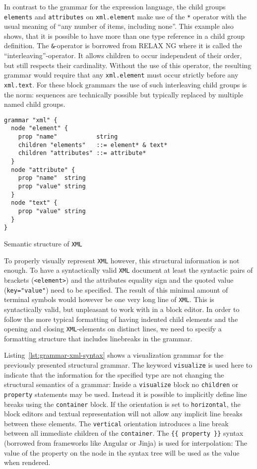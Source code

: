 \documentclass[sigconf,natbib=false,review=true,anonymous]{acmart}
\begin{document}
In contrast to the grammar for the expression language, the child groups \texttt{elements} and \texttt{attributes} on \texttt{xml.element} make use of the \texttt{*} operator with the usual meaning of \enquote{any number of items, including none}. This example also shows, that it is possible to have more than one type reference in a child group definition. The \texttt{\&}-operator is borrowed from RELAX NG where it is called the \enquote{interleaving}-operator. It allows children to occur independent of their order, but still respects their cardinality. Without the use of this operator, the resulting grammar would require that any \texttt{xml.element} must occur strictly before any \texttt{xml.text}. For these block grammars the use of such interleaving child groups is the norm: sequences are technically possible but typically replaced by multiple named child groups.

\begin{listing}[H]
\begin{verbatim}
grammar "xml" {
  node "element" {
    prop "name"           string
    children "elements"   ::= element* & text*
    children "attributes" ::= attribute*
  }
  node "attribute" {
    prop "name"  string
    prop "value" string
  }
  node "text" {
    prop "value" string
  }
}
\end{verbatim}
\caption{Semantic structure of \texttt{XML}}
\label{lst:grammar-xml-structure}
\end{listing}

To properly visually represent \texttt{XML} however, this structural information is not enough. To have a syntactically valid \texttt{XML} document at least the syntactic pairs of brackets (\texttt{<element>}) and the attributes equality sign and the quoted value (\texttt{key="value"}) need to be specified. The result of this minimal amount of terminal symbols would however be one very long line of \texttt{XML}. This is syntactically valid, but unpleasant to work with in a block editor. In order to follow the more typical formatting of having indented child elements and the opening and closing \texttt{XML}-elements on distinct lines, we need to specify a formatting structure that includes linebreaks in the grammar.

Listing~\ref{lst:grammar-xml-syntax} shows a visualization grammar for the previously presented structural grammar. The keyword \texttt{visualize} is used here to indicate that the information for the specified type are not changing the structural semantics of a grammar: Inside a \texttt{visualize} block no \texttt{children} or \texttt{property} statements may be used. Instead it is possible to implicitly define line breaks using the \texttt{container} block. If the orientation is set to \texttt{horizontal}, the block editors and textual representation will not allow any implicit line breaks between these elements. The \texttt{vertical} orientation introduces a line break between all immediate children of the \texttt{container}. The \texttt{\{\{ property \}\}} syntax (borrowed from frameworks like Angular or Jinja) is used for interpolation: The value of the property on the node in the syntax tree will be used as the value when rendered.
\end{document}
